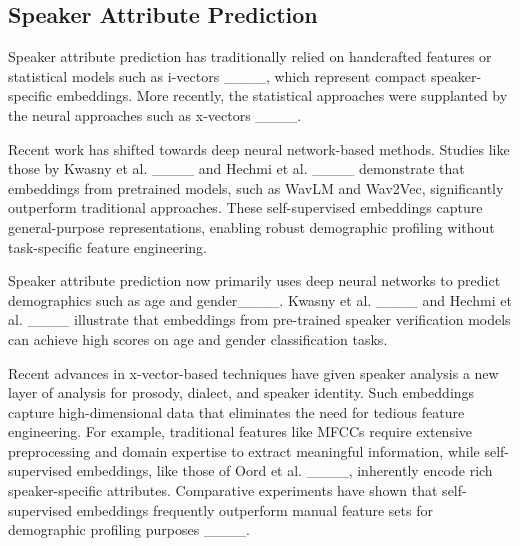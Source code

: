 

\subsection{Speaker Attribute Prediction} 
Speaker attribute prediction has traditionally relied on handcrafted features or statistical models such as i-vectors ____, which represent compact speaker-specific embeddings.
More recently, the statistical approaches were supplanted by the neural approaches such as x-vectors ____.

Recent work has shifted towards deep neural network-based methods. Studies like those by Kwasny et al. ____ and Hechmi et al. ____ demonstrate that embeddings from pretrained models, such as WavLM and Wav2Vec, significantly outperform traditional approaches. These self-supervised embeddings capture general-purpose representations, enabling robust demographic profiling without task-specific feature engineering.

Speaker attribute prediction now primarily uses deep neural networks to predict demographics such as age and gender____. 
Kwasny et al. ____ and Hechmi et al. ____ illustrate that embeddings from pre-trained speaker verification models can achieve high scores on age and gender classification tasks. 

Recent advances in x-vector-based techniques have given speaker analysis a new layer of analysis for prosody, dialect, and speaker identity. Such embeddings capture high-dimensional data that eliminates the need for tedious feature engineering. For example, traditional features like MFCCs require extensive preprocessing and domain expertise to extract meaningful information, while self-supervised embeddings, like those of Oord et al. ____, inherently encode rich speaker-specific attributes. Comparative experiments have shown that self-supervised embeddings frequently outperform manual feature sets for demographic profiling purposes ____.

